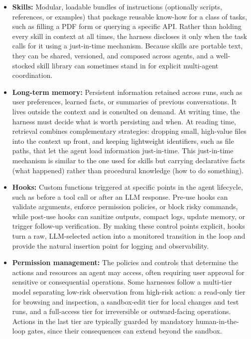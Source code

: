 \documentclass{article}
\begin{document}
\begin{itemize}
    \item \textbf{Skills:} Modular, loadable bundles of instructions (optionally scripts, references, or examples) that package reusable know-how for a class of tasks, such as filling a PDF form or querying a specific API. Rather than holding every skill in context at all times, the harness discloses it only when the task calls for it using a just-in-time mechanism. Because skills are portable text, they can be shared, versioned, and composed across agents, and a well-stocked skill library can sometimes stand in for explicit multi-agent coordination.
    
    \item \textbf{Long-term memory:} Persistent information retained across runs, such as user preferences, learned facts, or summaries of previous conversations. It lives outside the context and is consulted on demand. At writing time, the harness must decide what is worth persisting and when. At reading time, retrieval combines complementary strategies: dropping small, high-value files into the context up front, and keeping lightweight identifiers, such as file paths, that let the agent load information just-in-time. This just-in-time mechanism is similar to the one used for skills but carrying declarative facts (what happened) rather than procedural knowledge (how to do something).

    \item \textbf{Hooks:} Custom functions triggered at specific points in the agent lifecycle, such as before a tool call or after an LLM response. Pre-use hooks can validate arguments, enforce permission policies, or block risky commands, while post-use hooks can sanitize outputs, compact logs, update memory, or trigger follow-up verification. By making these control points explicit, hooks turn a raw, LLM-selected action into a monitored transition in the loop and provide the natural insertion point for logging and observability.
    
    \item \textbf{Permission management:} The policies and controls that determine the actions and resources an agent may access, often requiring user approval for sensitive or consequential operations. Some harnesses follow a multi-tier model separating low-risk observation from high-risk action: a read-only tier for browsing and inspection, a sandbox-edit tier for local changes and test runs, and a full-access tier for irreversible or outward-facing operations. Actions in the last tier are typically guarded by mandatory human-in-the-loop gates, since their consequences can extend beyond the sandbox.


\end{itemize}
\end{document}
